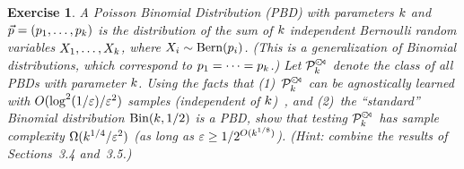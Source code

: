 \documentclass[biber,plain]{nowfnt} %
\newtheorem{question}{Exercise}[chapter]
\begin{document}
\newcommand{\pbd}{\hspace{1pt}{\cdot}\kern -4pt {\subset}\kern -3pt {\rtimes}}
\begin{question}\label{ex:testing:pbd}
  A \emph{Poisson Binomial Distribution} (PBD) with parameters $k$ and $\vec{p}=(p_1,\dots,p_k)$ is the distribution of the sum of $k$ independent Bernoulli random variables $X_1,\dots,X_k$, where $X_i \sim \operatorname{Bern}( p_i ) $. (This is a generalization of Binomial distributions, which correspond to $p_1=\dots=p_k$.) Let $\property^{\pbd}_{\ab}$ denote the class of all PBDs with parameter $k$. Using the facts that (1)~$\property^{\pbd}_{\ab}$ can be agnostically learned with $O(\log^2(1/\varepsilon)/\varepsilon^2)$ samples (independent of $k$)~\citep{DDS:PBD:15}, and (2)~the ``standard'' Binomial distribution $\binomial{\ab}{1/2}$ is a PBD, show that testing $\property^{\pbd}_{\ab}$ has sample complexity $\Omega(k^{1/4}/\varepsilon^2)$ (as long as $\varepsilon \geq 1/2^{O(k^{1/8})}$). \textit{(Hint: combine the results of Sections~3.4 and~3.5.)}
\end{question}
\end{document}
